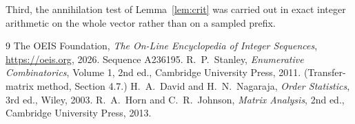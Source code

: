 \documentclass[11pt,a4paper]{article}
\theoremstyle{plain}
\theoremstyle{definition}
\begin{document}
Third, the annihilation test of Lemma~\ref{lem:crit} was carried out in exact integer
arithmetic on the whole vector rather than on a sampled prefix.

\begin{thebibliography}{9}
 The OEIS Foundation, \emph{The On-Line Encyclopedia of Integer
Sequences}, \url{https://oeis.org}, 2026. Sequence A236195.
 R.~P.~Stanley, \emph{Enumerative Combinatorics}, Volume 1, 2nd ed.,
Cambridge University Press, 2011. (Transfer-matrix method, Section 4.7.)
 H.~A.~David and H.~N.~Nagaraja, \emph{Order Statistics}, 3rd ed., Wiley,
2003.
 R.~A.~Horn and C.~R.~Johnson, \emph{Matrix Analysis}, 2nd ed., Cambridge
University Press, 2013.
\end{thebibliography}
\end{document}
